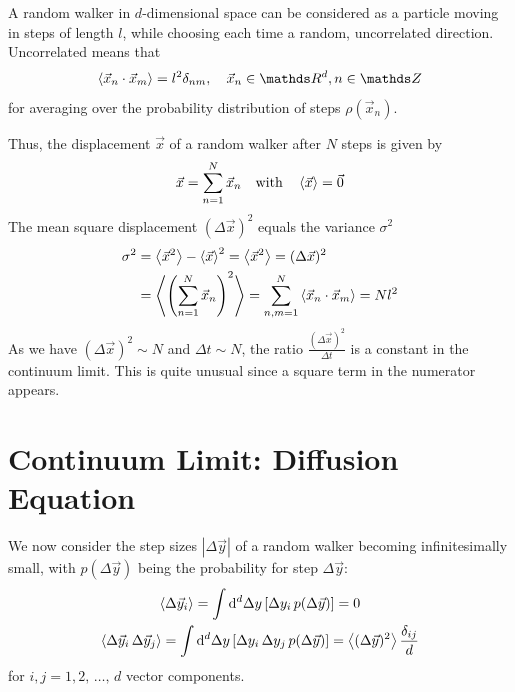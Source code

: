 \documentclass{notebook}
\begin{document}
%
\begin{theorem}
	A random walker in $d$-dimensional space can be considered as a particle moving in steps of length $l$, while choosing each time a random, uncorrelated direction. Uncorrelated means that
	\begin{equation}
	\expval{\vec{x}_n \cdot \vec{x}_m} = l^2 \delta_{nm}, \quad \vec{x}_n \in \R^d, n \in \Z
	\end{equation}
	for averaging over the probability distribution of steps $\rho(\vec{x}_n)$.
\end{theorem}
%

Thus, the displacement $\vec{x}$ of a random walker after $N$ steps is given by
%
\begin{equation}
\vec{x} = \sum^N_{n = 1}{\vec{x}_n} \quad \mathrm{with} \quad \expval{\vec{x}} = \vec{0}
\end{equation}
%
The mean square displacement $(\Delta \vec{x})^2$ equals the variance $\sigma^2$
%
\begin{align*}
\sigma^2 &= \expval{\vec{x}^2} - \expval{\vec{x}}^2 = \expval{\vec{x}^2} = (\Delta \vec{x})^2 \\ 
&= \expval{\left( \sum^N_{n = 1}{\vec{x}_n} \right)^2} = \sum^N_{n, m = 1}\expval{\vec{x}_n \cdot \vec{x}_m} = N l^2
\end{align*}
%
As we have $(\Delta \vec{x})^2 \sim N$ and $\Delta t \sim N $, the ratio $\frac{(\Delta \vec{x})^2}{\Delta t}$ is a constant in the continuum limit. This is quite unusual since a square term in the numerator appears.  

\section{Continuum Limit: Diffusion Equation}

We now consider the step sizes $|\Delta \vec{y}|$ of a random walker becoming infinitesimally small, with $p(\Delta \vec{y})$ being the probability for step $\Delta \vec{y}$:
%
\begin{gather}
\expval{\Delta \vec{y}_i} = \int{\dd[d]{\Delta y} \left[ \Delta y_i \, p(\Delta \vec{y}) \right]} = 0 \\
\expval{\Delta \vec{y}_i \, \Delta \vec{y}_j} = \int{\dd[d]{\Delta y} \left[ \Delta y_i \, \Delta y_j \, p(\Delta \vec{y}) \right]} = \expval{(\Delta \vec{y})^2} \frac{\delta_{ij}}{d}
\end{gather}
%
for $i, j = 1, 2, \, \dots, \, d$ vector components.
\end{document}
